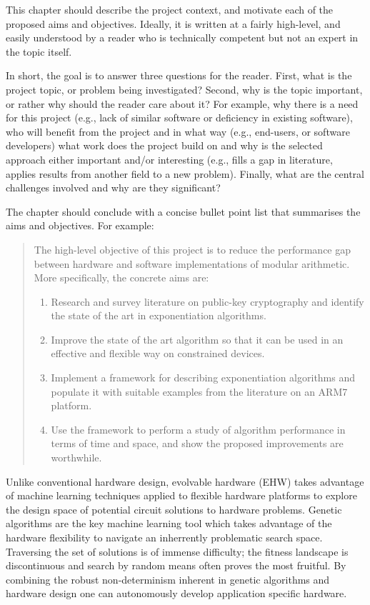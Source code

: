 {
\color{red}
\noindent
This chapter should describe the project context, and motivate each of
the proposed aims and objectives.  Ideally, it is written at a fairly
high-level, and easily understood by a reader who is technically
competent but not an expert in the topic itself.

In short, the goal is to answer three questions for the reader.  First,
what is the project topic, or problem being investigated?  Second, why
is the topic important, or rather why should the reader care about it?
For example, why there is a need for this project (e.g., lack of similar
software or deficiency in existing software), who will benefit from the
project and in what way (e.g., end-users, or software developers) what
work does the project build on and why is the selected approach either
important and/or interesting (e.g., fills a gap in literature, applies
results from another field to a new problem).  Finally, what are the
central challenges involved and why are they significant?

The chapter should conclude with a concise bullet point list that
summarises the aims and objectives.  For example:

\begin{quote}
\noindent
The high-level objective of this project is to reduce the performance
gap between hardware and software implementations of modular arithmetic.
More specifically, the concrete aims are:

\begin{enumerate}
\item Research and survey literature on public-key cryptography and
      identify the state of the art in exponentiation algorithms.
\item Improve the state of the art algorithm so that it can be used
      in an effective and flexible way on constrained devices.
\item Implement a framework for describing exponentiation algorithms
      and populate it with suitable examples from the literature on
      an ARM7 platform.
\item Use the framework to perform a study of algorithm performance
      in terms of time and space, and show the proposed improvements
      are worthwhile.
\end{enumerate}
\end{quote}
}

Unlike conventional hardware design, evolvable hardware (EHW) takes
advantage of machine learning techniques applied to
flexible hardware platforms to explore the design space of potential
circuit solutions to hardware problems.
Genetic algorithms are the key machine learning tool which takes advantage
of the hardware flexibility to navigate an inherrently problematic search
space.
Traversing the set of solutions is of immense difficulty; the fitness landscape
is discontinuous and
search by random means often proves the most fruitful. By combining
the robust non-determinism inherent in genetic algorithms and hardware design
one can autonomously develop application specific hardware.

